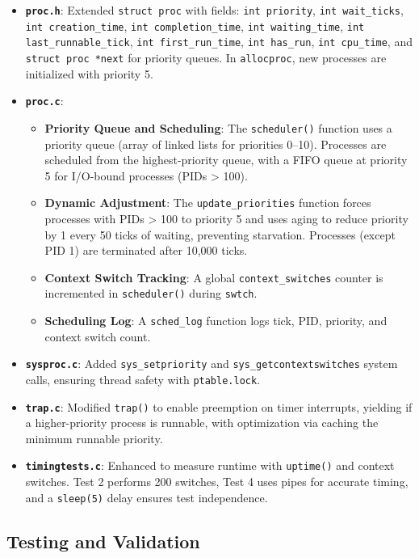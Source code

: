 \documentclass[12pt]{article}
\begin{document}
\begin{itemize}
  \item \textbf{\texttt{proc.h}}: Extended \texttt{struct proc} with fields: \texttt{int priority}, \texttt{int wait\_ticks}, \texttt{int creation\_time}, \texttt{int completion\_time}, \texttt{int waiting\_time}, \texttt{int last\_runnable\_tick}, \texttt{int first\_run\_time}, \texttt{int has\_run}, \texttt{int cpu\_time}, and \texttt{struct proc *next} for priority queues. In \texttt{allocproc}, new processes are initialized with priority 5.
  \item \textbf{\texttt{proc.c}}:
    \begin{itemize}
      \item \textbf{Priority Queue and Scheduling}: The \texttt{scheduler()} function uses a priority queue (array of linked lists for priorities 0–10). Processes are scheduled from the highest-priority queue, with a FIFO queue at priority 5 for I/O-bound processes (PIDs > 100).
      \item \textbf{Dynamic Adjustment}: The \texttt{update\_priorities} function forces processes with PIDs > 100 to priority 5 and uses aging to reduce priority by 1 every 50 ticks of waiting, preventing starvation. Processes (except PID 1) are terminated after 10,000 ticks.
      \item \textbf{Context Switch Tracking}: A global \texttt{context\_switches} counter is incremented in \texttt{scheduler()} during \texttt{swtch}.
      \item \textbf{Scheduling Log}: A \texttt{sched\_log} function logs tick, PID, priority, and context switch count.
    \end{itemize}
  \item \textbf{\texttt{sysproc.c}}: Added \texttt{sys\_setpriority} and \texttt{sys\_getcontextswitches} system calls, ensuring thread safety with \texttt{ptable.lock}.
  \item \textbf{\texttt{trap.c}}: Modified \texttt{trap()} to enable preemption on timer interrupts, yielding if a higher-priority process is runnable, with optimization via caching the minimum runnable priority.
  \item \textbf{\texttt{timingtests.c}}: Enhanced to measure runtime with \texttt{uptime()} and context switches. Test 2 performs 200 switches, Test 4 uses pipes for accurate timing, and a \texttt{sleep(5)} delay ensures test independence.
\end{itemize}

\subsection{Testing and Validation}
\label{subsec:priority-testing}
\end{document}
